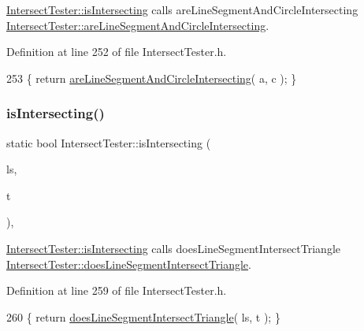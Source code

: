 \hyperlink{class_intersect_tester_a7710e17ff7d2e229059f23b9429213f5}{Intersect\+Tester\+::is\+Intersecting} calls are\+Line\+Segment\+And\+Circle\+Intersecting  \hyperlink{class_intersect_tester_a36c9fcad6ad5607f5a47369aeb2b57c3}{Intersect\+Tester\+::are\+Line\+Segment\+And\+Circle\+Intersecting}. 



Definition at line 252 of file Intersect\+Tester.\+h.


\begin{DoxyCode}
253     \{ \textcolor{keywordflow}{return} \hyperlink{class_intersect_tester_a36c9fcad6ad5607f5a47369aeb2b57c3}{areLineSegmentAndCircleIntersecting}( a, c ); \}
\end{DoxyCode}
\mbox{\label{class_intersect_tester_aa7f33e35eaa5d3662fc8a57e99eff82f}} 
\subsubsection{\texorpdfstring{is\+Intersecting()}{isIntersecting()}\hspace{0.1cm}{\footnotesize\ttfamily [8/15]}}
{\footnotesize\ttfamily static bool Intersect\+Tester\+::is\+Intersecting (\begin{DoxyParamCaption}\item[{\hyperlink{class_line_segment}{Line\+Segment}}]{ls,  }\item[{\hyperlink{class_triangle}{Triangle}}]{t }\end{DoxyParamCaption})\hspace{0.3cm}{\ttfamily [inline]}, {\ttfamily [static]}}



\hyperlink{class_intersect_tester_a7710e17ff7d2e229059f23b9429213f5}{Intersect\+Tester\+::is\+Intersecting} calls does\+Line\+Segment\+Intersect\+Triangle  \hyperlink{class_intersect_tester_a7e7603c33cc5921adb9d0d24eb76ebc9}{Intersect\+Tester\+::does\+Line\+Segment\+Intersect\+Triangle}. 



Definition at line 259 of file Intersect\+Tester.\+h.


\begin{DoxyCode}
260     \{ \textcolor{keywordflow}{return} \hyperlink{class_intersect_tester_a7e7603c33cc5921adb9d0d24eb76ebc9}{doesLineSegmentIntersectTriangle}( ls, t ); \}
\end{DoxyCode}
\mbox{\label{class_intersect_tester_a6caf298c7e2e46a9b00f68ce9554a5eb}} 
